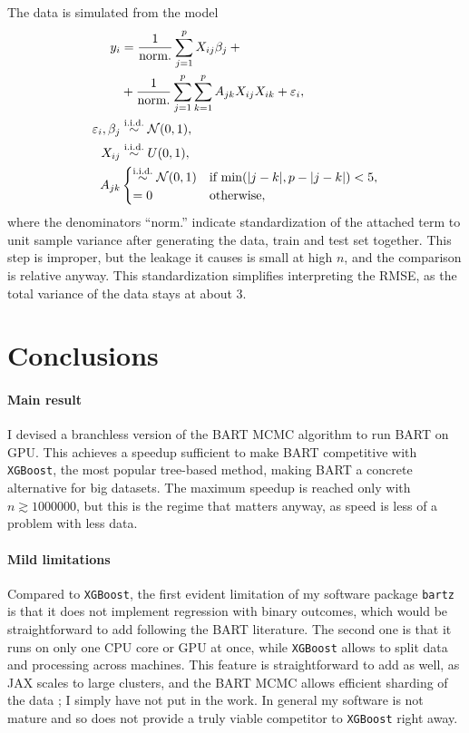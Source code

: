 \documentclass{article}
\begin{document}
    The data is simulated from the model
    \begin{align}
        y_i &= \frac 1{\text{norm.}} \sum_{j=1}^p X_{ij} \beta_j + {} \notag \\
        &{} + \frac 1{\text{norm.}} \sum_{j=1}^p \sum_{k=1}^p A_{jk} X_{ij} X_{ik} + \varepsilon_i, \label{eq:rmsedgp} \\
        \varepsilon_i, \beta_j &\overset{\text{i.i.d.}}{\sim} \mathcal N(0, 1), \\
        X_{ij} &\overset{\text{i.i.d.}}{\sim} U(0, 1), \\
        A_{jk} &\begin{cases}
            \overset{\text{i.i.d.}}{\sim} \mathcal N(0, 1) & \text{if $\min(|j - k|, p - |j - k|) < 5$}, \\
            =0 & \text{otherwise},
        \end{cases}
    \end{align}
    where the denominators ``norm.'' indicate standardization of the attached term to unit sample variance after generating the data, train and test set together. This step is improper, but the leakage it causes is small at high $n$, and the comparison is relative anyway. This standardization simplifies interpreting the RMSE, as the total variance of the data stays at about 3.

    \section{Conclusions}
    \label{sec:conclusions}

    \paragraph{Main result}

    I devised a branchless version of the BART MCMC algorithm to run BART on GPU. This achieves a speedup sufficient to make BART competitive with \texttt{XGBoost}, the most popular tree-based method, making BART a concrete alternative for big datasets. The maximum speedup is reached only with $n\gtrsim\num{1000000}$, but this is the regime that matters anyway, as speed is less of a problem with less data.

    \paragraph{Mild limitations}

    Compared to \texttt{XGBoost}, the first evident limitation of my software package \texttt{bartz} is that it does not implement regression with binary outcomes, which would be straightforward to add following the BART literature. The second one is that it runs on only one CPU core or GPU at once, while \texttt{XGBoost} allows to split data and processing across machines. This feature is straightforward to add as well, as JAX scales to large clusters, and the BART MCMC allows efficient sharding of the data \citep{pratola2014}; I simply have not put in the work. In general my software is not mature and so does not provide a truly viable competitor to \texttt{XGBoost} right away.
\end{document}

